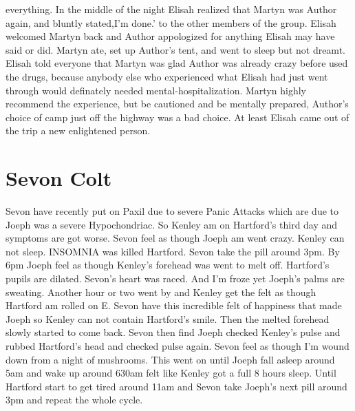 \documentclass[12pt]{book}
\begin{document}
everything. In the middle of the night Elisah realized that Martyn was Author again, and bluntly stated,I'm done.' to the other members of the group. Elisah welcomed Martyn back and Author appologized for anything Elisah may have said or did. Martyn ate, set up Author's tent, and went to sleep but not dreamt. Elisah told everyone that Martyn was glad Author was already crazy before used the drugs, because anybody else who experienced what Elisah had just went through would definately needed mental-hospitalization. Martyn highly recommend the experience, but be cautioned and be mentally prepared, Author's choice of camp just off the highway was a bad choice. At least Elisah came out of the trip a new enlightened person.



\chapter{Sevon Colt}

Sevon have recently put on Paxil due to severe Panic Attacks which are due to Joeph was a severe Hypochondriac. So Kenley am on Hartford's third day and symptoms are got worse. Sevon feel as though Joeph am went crazy. Kenley can not sleep. INSOMNIA was killed Hartford. Sevon take the pill around 3pm. By 6pm Joeph feel as though Kenley's forehead was went to melt off. Hartford's pupils are dilated. Sevon's heart was raced. And I'm froze yet Joeph's palms are sweating. Another hour or two went by and Kenley get the felt as though Hartford am rolled on E. Sevon have this incredible felt of happiness that made Joeph so Kenley can not contain Hartford's smile. Then the melted forehead slowly started to come back. Sevon then find Joeph checked Kenley's pulse and rubbed Hartford's head and checked pulse again. Sevon feel as though I'm wound down from a night of mushrooms. This went on until Joeph fall asleep around 5am and wake up around 630am felt like Kenley got a full 8 hours sleep. Until Hartford start to get tired around 11am and Sevon take Joeph's next pill around 3pm and repeat the whole cycle.
\end{document}
